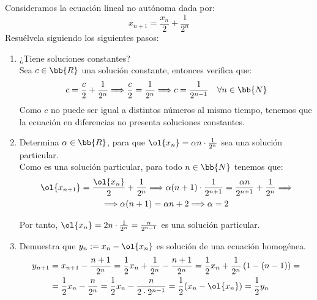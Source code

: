 \begin{ejercicio*}
    Consideramos la ecuación lineal no autónoma dada por:
    \begin{equation*}
        x_{n+1} = \frac{x_n}{2} + \frac{1}{2^n}
    \end{equation*}
    Resuélvela siguiendo los siguientes pasos:
    \begin{enumerate}
        \item ¿Tiene soluciones constantes?\\
         Sea $c\in\bb{R}$ una solución constante, entonces verifica que:
        \begin{equation*}
            c = \dfrac{c}{2}+\dfrac{1}{2^n} \Longrightarrow \dfrac{c}{2} = \dfrac{1}{2^n} \Longrightarrow c = \dfrac{1}{2^{n-1}}\quad \forall n \in \bb{N}
        \end{equation*}
        Como $c$ no puede ser igual a distintos números al mismo tiempo, tenemos que la ecuación en diferencias no presenta soluciones constantes.
        
        \item Determina $\alpha\in \bb{R}$, para que $\ol{x_n}=\alpha n\cdot\frac{1}{2^n}$ sea una solución particular.\\

        Como es una solución particular, para todo $n\in \bb{N}$ tenemos que:
        \begin{multline*}
            \ol{x_{n+1}} = \frac{\ol{x_n}}{2} + \frac{1}{2^n} \Longrightarrow 
            \alpha (n+1)\cdot \frac{1}{2^{n+1}} = \frac{\alpha n}{2^{n+1}} + \frac{1}{2^n}
            \Longrightarrow \\ \Longrightarrow \alpha(n+1) = \alpha n + 2
            \Longrightarrow \alpha = 2
        \end{multline*}

        Por tanto, $\ol{x_n} = 2n\cdot \frac{1}{2^n} = \frac{n}{2^{n-1}}$ es una solución particular.
        
        \item Demuestra que $y_n:=x_n-\ol{x_n}$ es solución de una ecuación homogénea.
        \begin{align*}
            y_{n+1} &= x_{n+1} - \dfrac{n+1}{2^n} = \dfrac{1}{2}x_n + \frac{1}{2^n} - \dfrac{n+1}{2^n}
            = \frac{1}{2}x_n + \frac{1}{2^n}\left(1-(n-1)\right)=\\
            &= \frac{1}{2}x_n - \frac{n}{2^n}
            = \frac{1}{2}x_n - \frac{n}{2\cdot 2^{n-1}}
            =\dfrac{1}{2}(x_n-\ol{x_n})
            = \dfrac{1}{2}y_n 
        \end{align*}


\end{enumerate}
\end{ejercicio*}
